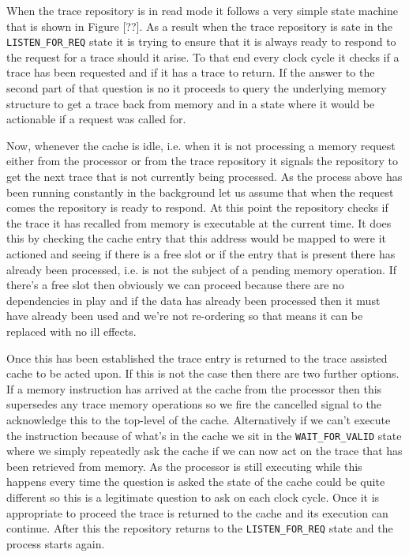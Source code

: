 When the trace repository is in read mode it follows a very simple state machine that is shown in Figure [??]. As a result when the trace repository is sate in the \texttt{LISTEN\_FOR\_REQ} state it is trying to ensure that it is always ready to respond to the request for a trace should it arise. To that end every clock cycle it checks if a trace has been requested and if it has a trace to return. If the answer to the second part of that question is no it proceeds to query the underlying memory structure to get a trace back from memory and in a state where it would be actionable if a request was called for. 

Now, whenever the cache is idle, i.e. when it is not processing a memory request either from the processor or from the trace repository it signals the repository to get the next trace that is not currently being processed. As the process above has been running constantly in the background let us assume that when the request comes the repository is ready to respond. At this point the repository checks if the trace it has recalled from memory is executable at the current time. It does this by checking the cache entry that this address would be mapped to were it actioned and seeing if there is a free slot or if the entry that is present there has already been processed, i.e. is not the subject of a pending memory operation. If there's a free slot then obviously we can proceed because there are no dependencies in play and if the data has already been processed then it must have already been used and we're not re-ordering so that means it can be replaced with no ill effects. 

Once this has been established the trace entry is returned to the trace assisted cache to be acted upon. If this is not the case then there are two further options. If a memory instruction has arrived at the cache from the processor then this supersedes any trace memory operations so we fire the cancelled signal to the acknowledge this to the top-level of the cache. Alternatively if we can't execute the instruction because of what's in the cache we sit in the \texttt{WAIT\_FOR\_VALID} state where we simply repeatedly ask the cache if we can now act on the trace that has been retrieved from memory. As the processor is still executing while this happens every time the question is asked the state of the cache could be quite different so this is a legitimate question to ask on each clock cycle. Once it is appropriate to proceed the trace is returned to the cache and its execution can continue. After this the repository returns to the \texttt{LISTEN\_FOR\_REQ} state and the process starts again.

